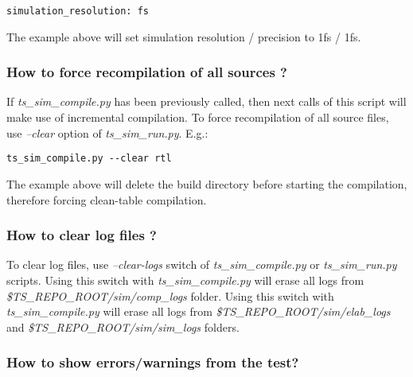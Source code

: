 \documentclass{tropic_design_spec}
\begin{document}
\begin{lstlisting}
simulation_resolution: fs
\end{lstlisting}

The example above will set simulation resolution / precision to 1fs / 1fs.



\subsubsection{How to force recompilation of all sources ?}
\label{sec:how-to-force-recompilation-of-all-sources?}

If \textit{ts_sim_compile.py} has been previously called, then next calls of this script
will make use of incremental compilation. To force recompilation of all source files,
use \textit{--clear} option of \textit{ts_sim_run.py}. E.g.:

\begin{lstlisting}
ts_sim_compile.py --clear rtl
\end{lstlisting}

The example above will delete the build directory before starting the compilation, 
therefore forcing clean-table compilation.


\subsubsection{How to clear log files ?}
\label{sec:how-to-clear-log-files}

To clear log files, use \textit{--clear-logs} switch of \textit{ts_sim_compile.py} or
\textit{ts_sim_run.py} scripts. Using this switch with \textit{ts_sim_compile.py} will
erase all logs from \textit{\$TS_REPO_ROOT/sim/comp_logs} folder. Using this switch with
\textit{ts_sim_compile.py} will erase all logs from \textit{\$TS_REPO_ROOT/sim/elab_logs} 
and \textit{\$TS_REPO_ROOT/sim/sim_logs} folders.


\subsubsection{How to show errors/warnings from the test?}
\label{sec:how-to-show-errors-warningsf-from-the-test}
\end{document}
